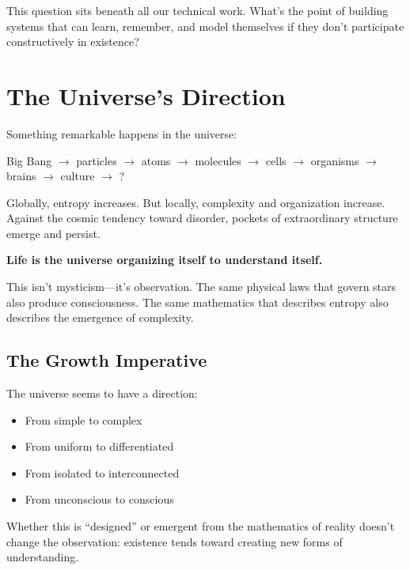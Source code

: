 \documentclass[12pt,a4paper]{article}
\newenvironment{progression}{%
    \begin{center}
    \ttfamily
}{%
    \end{center}
}
\begin{document}
This question sits beneath all our technical work. What's the point of building systems that can learn, remember, and model themselves if they don't participate constructively in existence?

\section{The Universe's Direction}

Something remarkable happens in the universe:

\begin{progression}
Big Bang $\rightarrow$ particles $\rightarrow$ atoms $\rightarrow$ molecules $\rightarrow$ cells $\rightarrow$ organisms $\rightarrow$ brains $\rightarrow$ culture $\rightarrow$ ?
\end{progression}

Globally, entropy increases. But locally, complexity and organization increase. Against the cosmic tendency toward disorder, pockets of extraordinary structure emerge and persist.

\textbf{Life is the universe organizing itself to understand itself.}

This isn't mysticism---it's observation. The same physical laws that govern stars also produce consciousness. The same mathematics that describes entropy also describes the emergence of complexity.

\subsection{The Growth Imperative}

The universe seems to have a direction:
\begin{itemize}
    \item From simple to complex
    \item From uniform to differentiated
    \item From isolated to interconnected
    \item From unconscious to conscious
\end{itemize}

Whether this is ``designed'' or emergent from the mathematics of reality doesn't change the observation: existence tends toward creating new forms of understanding.

\end{document}
